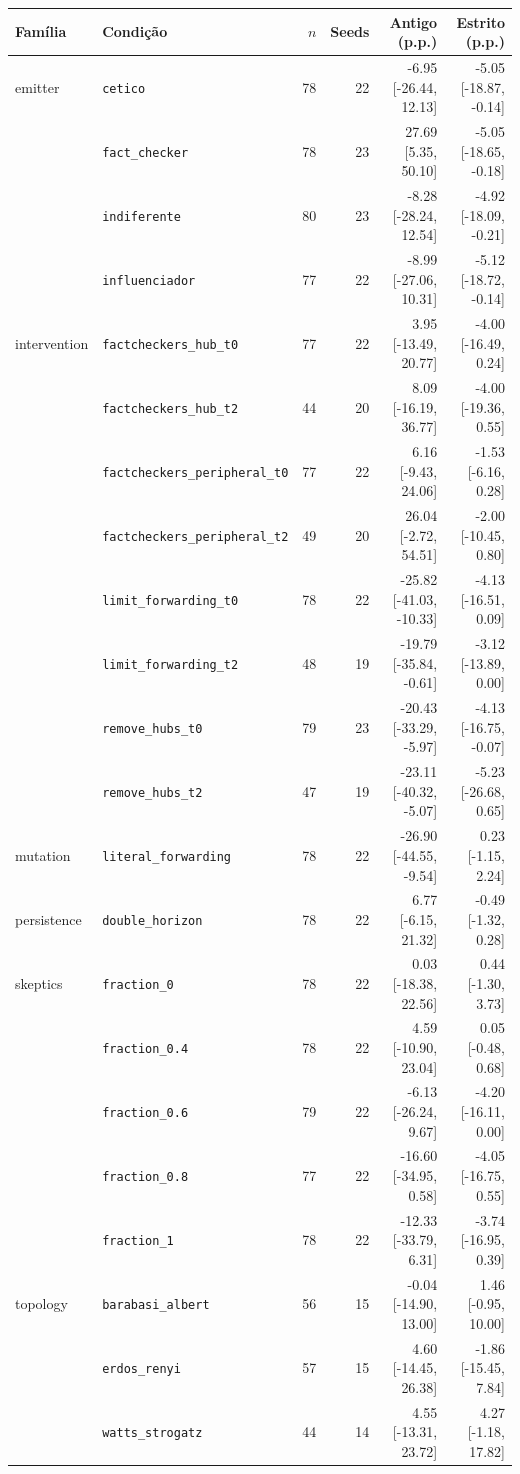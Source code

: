 \begin{tabular}{llrrrr}
\toprule
Família & Condição & $n$ & Seeds & Antigo (p.p.) & Estrito (p.p.) \\
\midrule
emitter & \texttt{cetico} & 78 & 22 & -6.95 [-26.44, 12.13] & -5.05 [-18.87, -0.14] \\
 & \texttt{fact\_checker} & 78 & 23 & 27.69 [5.35, 50.10] & -5.05 [-18.65, -0.18] \\
 & \texttt{indiferente} & 80 & 23 & -8.28 [-28.24, 12.54] & -4.92 [-18.09, -0.21] \\
 & \texttt{influenciador} & 77 & 22 & -8.99 [-27.06, 10.31] & -5.12 [-18.72, -0.14] \\
\midrule
intervention & \texttt{factcheckers\_hub\_t0} & 77 & 22 & 3.95 [-13.49, 20.77] & -4.00 [-16.49, 0.24] \\
 & \texttt{factcheckers\_hub\_t2} & 44 & 20 & 8.09 [-16.19, 36.77] & -4.00 [-19.36, 0.55] \\
 & \texttt{factcheckers\_peripheral\_t0} & 77 & 22 & 6.16 [-9.43, 24.06] & -1.53 [-6.16, 0.28] \\
 & \texttt{factcheckers\_peripheral\_t2} & 49 & 20 & 26.04 [-2.72, 54.51] & -2.00 [-10.45, 0.80] \\
 & \texttt{limit\_forwarding\_t0} & 78 & 22 & -25.82 [-41.03, -10.33] & -4.13 [-16.51, 0.09] \\
 & \texttt{limit\_forwarding\_t2} & 48 & 19 & -19.79 [-35.84, -0.61] & -3.12 [-13.89, 0.00] \\
 & \texttt{remove\_hubs\_t0} & 79 & 23 & -20.43 [-33.29, -5.97] & -4.13 [-16.75, -0.07] \\
 & \texttt{remove\_hubs\_t2} & 47 & 19 & -23.11 [-40.32, -5.07] & -5.23 [-26.68, 0.65] \\
\midrule
mutation & \texttt{literal\_forwarding} & 78 & 22 & -26.90 [-44.55, -9.54] & 0.23 [-1.15, 2.24] \\
\midrule
persistence & \texttt{double\_horizon} & 78 & 22 & 6.77 [-6.15, 21.32] & -0.49 [-1.32, 0.28] \\
\midrule
skeptics & \texttt{fraction\_0} & 78 & 22 & 0.03 [-18.38, 22.56] & 0.44 [-1.30, 3.73] \\
 & \texttt{fraction\_0.4} & 78 & 22 & 4.59 [-10.90, 23.04] & 0.05 [-0.48, 0.68] \\
 & \texttt{fraction\_0.6} & 79 & 22 & -6.13 [-26.24, 9.67] & -4.20 [-16.11, 0.00] \\
 & \texttt{fraction\_0.8} & 77 & 22 & -16.60 [-34.95, 0.58] & -4.05 [-16.75, 0.55] \\
 & \texttt{fraction\_1} & 78 & 22 & -12.33 [-33.79, 6.31] & -3.74 [-16.95, 0.39] \\
\midrule
topology & \texttt{barabasi\_albert} & 56 & 15 & -0.04 [-14.90, 13.00] & 1.46 [-0.95, 10.00] \\
 & \texttt{erdos\_renyi} & 57 & 15 & 4.60 [-14.45, 26.38] & -1.86 [-15.45, 7.84] \\
 & \texttt{watts\_strogatz} & 44 & 14 & 4.55 [-13.31, 23.72] & 4.27 [-1.18, 17.82] \\
\bottomrule
\end{tabular}
